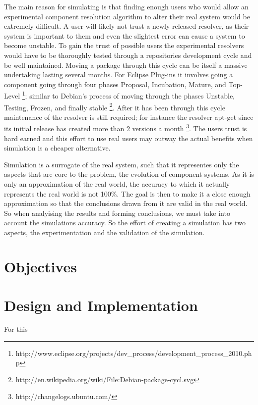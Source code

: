 The main reason for simulating is that finding enough users
who would allow an experimental component resolution algorithm to alter their real system would be extremely difficult.
A user will likely not trust a newly released resolver, as their system is important to them and even the slightest error can cause
a system to become unstable. 
To gain the trust of possible users the experimental resolvers would have to be thoroughly tested through a repositories development cycle and be well maintained.
Moving a package through this cycle can be itself a massive undertaking lasting several months. 
For Eclipse Plug-ins it involves going a component going through four phases 
Proposal, Incubation, Mature, and Top-Level \footnote{http://www.eclipse.org/projects/dev\_process/development\_process\_2010.php};
similar to Debian's process of moving through the phases Unstable, Testing, Frozen, and finally stable \footnote{http://en.wikipedia.org/wiki/File:Debian-package-cycl.svg}.
After it has been through this cycle maintenance of the resolver is still required; 
for instance the resolver apt-get since its initial release has created more than 2 versions a month \footnote{http://changelogs.ubuntu.com/}.
The users trust is hard earned and this effort to use real users may outway the actual benefits when simulation is a cheaper alternative.

Simulation is a surrogate of the real system, such that it representes only the aspects that are core to the problem, 
the evolution of component systems.
As it is only an approximation of the real world, 
the accuracy to which it actually represents the real world is not 100\%.
The goal is then to make it a close enough approximation so that the conclusions drawn from it are valid in the real world.
So when analyising the results and forming conclusions, we must take into account the simulations accuracy. 
So the effort of creating a simulation has two aspects, the experimentation and the validation of the simulation.

\section{Objectives}
 

\section{Design and Implementation}
For this 

